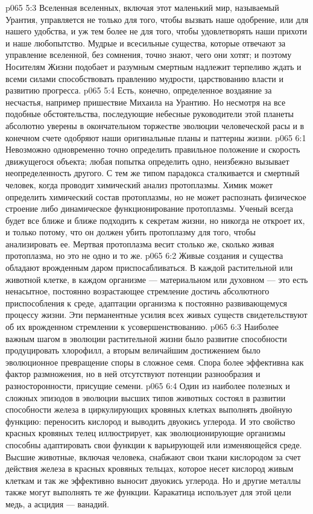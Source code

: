\vs p065 5:3 Вселенная вселенных, включая этот маленький мир, называемый Урантия, управляется не только для того, чтобы вызвать наше одобрение, или для нашего удобства, и уж тем более не для того, чтобы удовлетворять наши прихоти и наше любопытство. Мудрые и всесильные существа, которые отвечают за управление вселенной, без сомнения, точно знают, чего они хотят; и поэтому Носителям Жизни подобает и разумным смертным надлежит терпеливо ждать и всеми силами способствовать правлению мудрости, царствованию власти и развитию прогресса.
\vs p065 5:4 Есть, конечно, определенное воздаяние за несчастья, например пришествие Михаила на Урантию. Но несмотря на все подобные обстоятельства, последующие небесные руководители этой планеты абсолютно уверены в окончательном торжестве эволюции человеческой расы и в конечном счете одобряют наши оригинальные планы и паттерны жизни.
\vs p065 6:1 Невозможно одновременно точно определить правильное положение и скорость движущегося объекта; любая попытка определить одно, неизбежно вызывает неопределенность другого. С тем же типом парадокса сталкивается и смертный человек, когда проводит химический анализ протоплазмы. Химик может определить химический состав  протоплазмы, но не может распознать физическое строение либо динамическое функционирование  протоплазмы. Ученый всегда будет все ближе и ближе подходить к секретам жизни, но никогда не откроет их, и только потому, что он должен убить протоплазму для того, чтобы анализировать ее. Мертвая протоплазма весит столько же, сколько живая протоплазма, но это не одно и то же.
\vs p065 6:2 \pc Живые создания и существа обладают врожденным даром приспосабливаться. В каждой  растительной или животной клетке, в каждом  организме --- материальном или духовном --- это есть ненасытное, постоянно возрастающее стремление достичь абсолютного приспособления к среде, адаптации организма к постоянно развивающемуся процессу жизни. Эти перманентные усилия всех живых существ свидетельствуют об их врожденном стремлении к усовершенствованию.
\vs p065 6:3 Наиболее важным шагом в эволюции растительной жизни было развитие способности продуцировать хлорофилл, а вторым величайшим достижением было эволюционное превращение споры в сложное семя. Спора более эффективна как фактор размножения, но в ней отсутствуют потенции разнообразия и разносторонности, присущие семени.
\vs p065 6:4 Один из наиболее полезных и сложных эпизодов в эволюции высших типов животных состоял в развитии способности железа в циркулирующих кровяных клетках выполнять двойную функцию: переносить кислород и выводить двуокись углерода. И это свойство красных кровяных телец иллюстрирует, как эволюционирующие организмы способны адаптировать свои функции к варьирующей или изменяющейся среде. Высшие животные, включая человека, снабжают свои ткани кислородом за счет действия железа в красных кровяных тельцах, которое несет кислород живым клеткам и так же эффективно выносит двуокись углерода. Но и другие металлы также могут выполнять те же функции. Каракатица использует для этой цели медь, а асцидия --- ванадий.
